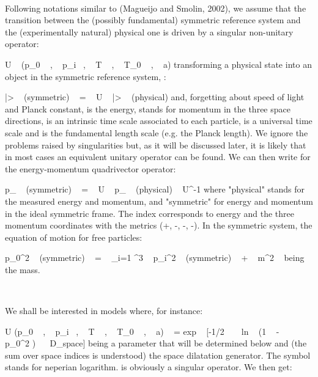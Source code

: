 \documentclass[a4paper,12pt,dvips]{article}
\begin{document}
~ 

Following notations similar to (Magueijo and Smolin, 2002), we assume that the transition between the (possibly fundamental) symmetric reference system and the (experimentally natural) physical one is driven by a singular non-unitary operator:

\equation
U ~ (p_0 ~ , ~ p_i ~, ~ T ~ , ~ T_0 ~ , ~ a) 
\endequation
\noindent
transforming a physical state \coordHE{} into an object in the symmetric reference system, \coordHE{} :

\equation
|\psi> ~ (symmetric) ~ = ~ U ~ |\psi> ~ (physical)
\endequation
\noindent
and, forgetting about speed of light and Planck constant, \coordHE{} is the energy, \coordHE{} stands for momentum in the three space directions, \coordHE{} is an intrinsic time scale associated to each particle, \coordHE{} is a universal time scale and \coordHE{} is the fundamental length scale (e.g. the Planck length). We ignore the problems raised by singularities but, as it will be discussed later, it is likely that in most cases an equivalent unitary operator can be found. We can then write for the energy-momentum quadrivector operator:

\equation
p_{\alpha} ~ (symmetric) ~ = ~ U ~ p_{\alpha} ~ (physical) ~ U^{-1}
\endequation
\noindent
where "physical" stands for the measured energy and momentum, and "symmetric" for energy and momentum in the ideal symmetric frame. The index \coordHE{} corresponds to energy and the three momentum coordinates with the metrics (+, -, -, -). 
\vskip 2mm
In the symmetric system, the equation of motion for free particles:

\equation
p_{0}^2 ~ (symmetric) ~ = ~ \Sigma _{i=1} ^3 ~ p_{i}^2 ~ (symmetric) ~ + ~ m^2
\endequation
\noindent
{}\coordHE{} ~ being the mass. 

~ 

We shall be interested in models where, for instance:

\equation
U (p_0 ~ , ~ p_i ~, ~ T ~ , ~ T_0 ~ , ~ a) ~ = exp ~ [-1/2 ~ ~ ln ~ (1 ~ - ~ \epsilon ~ p_0^2 ) ~ ~D_{space}]
\endequation
\noindent
\myHighlight{$\epsilon $}\coordHE{} being a parameter that will be determined below and \coordHE{} (the sum over space indices is understood) the space dilatation generator. The symbol \coordHE{} stands for neperian logarithm. \coordHE{} is obviously a singular operator. We then get:
\end{document}
